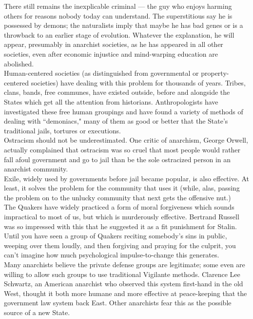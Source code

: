 There still remains the inexplicable criminal --- the guy who enjoys harming others for reasons nobody today can understand. The superstitious say he is possessed by demons; the naturalists imply that maybe he has bad genes or is a throwback to an earlier stage of evolution. Whatever the explanation, he will appear, presumably in anarchist societies, as he has appeared in all other societies, even after economic injustice and mind-warping education are abolished.\\
Human-centered societies (as distinguished from governmental or property-centered societies) have dealing with this problem for thousands of years. Tribes, clans, bands, free communes, have existed outside, before and alongside the States which get all the attention from historians. Anthropologists have investigated these free human groupings and have found a variety of methods of dealing with ``demoniacs," many of them as good or better that the State's traditional jails, tortures or executions.\\
Ostracism should not be underestimated. One critic of anarchism, George Orwell, actually complained that ostracism was so cruel that most people would rather fall afoul government and go to jail than be the sole ostracized person in an anarchist community.\\
Exile, widely used by governments before jail became popular, is also effective. At least, it solves the problem for the community that uses it (while, alas, passing the problem on to the unlucky community that next gets the offensive nut.)\\
The Quakers have widely practiced a form of moral forgiveness which sounds impractical to most of us, but which is murderously effective. Bertrand Russell was so impressed with this that he suggested it as a fit punishment for Stalin. Until you have seen a group of Quakers reciting somebody's sins in public, weeping over them loudly, and then forgiving and praying for the culprit, you can't imagine how much psychological impulse-to-change this generates.\\
Many anarchists believe the private defense groups are legitimate; some even are willing to allow such groups to use traditional Vigilante methods. Clarence Lee Schwartz, an American anarchist who observed this system first-hand in the old West, thought it both more humane and more effective at peace-keeping that the government law system back East. Other anarchists fear this as the possible source of a new State.\\
